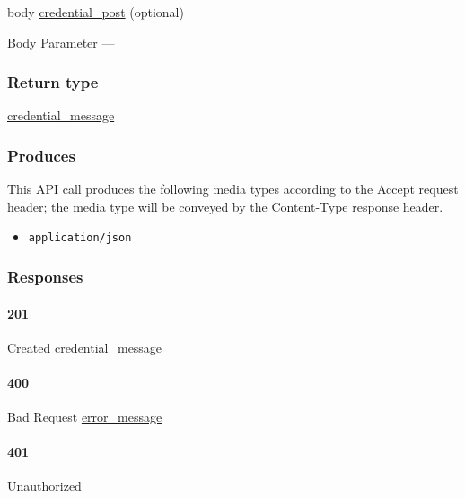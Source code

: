 body \protect\hyperlink{credential_post}{credential\_post} (optional)

{Body Parameter} ---

\hypertarget{return-type-24}{%
\subsubsection{Return type}\label{return-type-24}}

\protect\hyperlink{credential_message}{credential\_message}

\hypertarget{produces-31}{%
\subsubsection{Produces}\label{produces-31}}

This API call produces the following media types according to the
{Accept} request header; the media type will be conveyed by the
{Content-Type} response header.

\begin{itemize}
\tightlist
\item
  \texttt{application/json}
\end{itemize}

\hypertarget{responses-31}{%
\subsubsection{Responses}\label{responses-31}}

\hypertarget{section-104}{%
\paragraph{201}\label{section-104}}

Created \protect\hyperlink{credential_message}{credential\_message}

\hypertarget{section-105}{%
\paragraph{400}\label{section-105}}

Bad Request \protect\hyperlink{error_message}{error\_message}

\hypertarget{section-106}{%
\paragraph{401}\label{section-106}}

Unauthorized \protect\hyperlink{}{}

